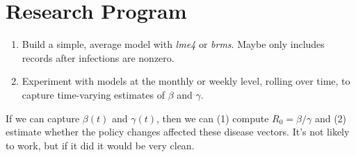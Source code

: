 \documentclass[11pt]{article}
\begin{document}
\section{Research Program}

\begin{enumerate}
  \item Build a simple, average model with \textit{lme4} or \textit{brms}. Maybe only includes records after infections are nonzero.
  \item Experiment with models at the monthly or weekly level, rolling over time, to capture time-varying estimates of $\beta$ and $\gamma$.
\end{enumerate}

If we can capture $\beta(t)$ and $\gamma(t)$, then we can (1) compute $R_0 = \beta/\gamma$ and (2) estimate whether the policy changes affected these disease vectors. It's not likely to work, but if it did it would be very clean.
\end{document}
